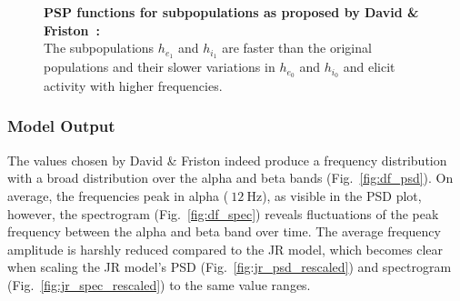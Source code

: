 \begin{figure}[H]
    \centering
    \pgfplotsset{compat = newest}

    \caption{\textbf{PSP functions for subpopulations as proposed by David \& Friston~\cite{david_neural_2003}:} \\
        The subpopulations $h_{e_1}$ and $h_{i_1}$ are faster
        than the original populations and their slower variations in $h_{e_0}$ and $h_{i_0}$ and
        elicit activity with higher frequencies.
    }
    \label{fig:PSPPlotDavidFriston}
\end{figure}

\subsubsection{Model Output}
The values chosen by David \& Friston indeed produce a frequency distribution
with a broad distribution over the alpha and beta bands (Fig.~\ref{fig:df_psd}).
On average, the frequencies peak in alpha ($~\SI{12}{\hertz}$), as visible in the PSD plot,
however, the spectrogram (Fig.~\ref{fig:df_spec}) reveals fluctuations of the peak frequency
between the alpha and beta band over time.
The average frequency amplitude is harshly reduced compared to the JR model,
which becomes clear when scaling the JR model's PSD (Fig.~\ref{fig:jr_psd_rescaled})
and spectrogram (Fig.~\ref{fig:jr_spec_rescaled}) to the same value ranges.

